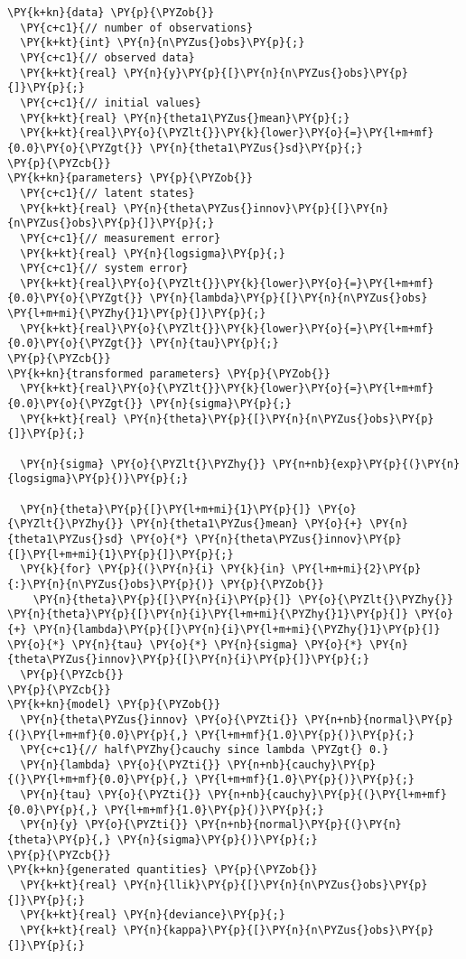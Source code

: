 \begin{Verbatim}[commandchars=\\\{\}]
\PY{k+kn}{data} \PY{p}{\PYZob{}}
  \PY{c+c1}{// number of observations}
  \PY{k+kt}{int} \PY{n}{n\PYZus{}obs}\PY{p}{;}
  \PY{c+c1}{// observed data}
  \PY{k+kt}{real} \PY{n}{y}\PY{p}{[}\PY{n}{n\PYZus{}obs}\PY{p}{]}\PY{p}{;}
  \PY{c+c1}{// initial values}
  \PY{k+kt}{real} \PY{n}{theta1\PYZus{}mean}\PY{p}{;}
  \PY{k+kt}{real}\PY{o}{\PYZlt{}}\PY{k}{lower}\PY{o}{=}\PY{l+m+mf}{0.0}\PY{o}{\PYZgt{}} \PY{n}{theta1\PYZus{}sd}\PY{p}{;}
\PY{p}{\PYZcb{}}
\PY{k+kn}{parameters} \PY{p}{\PYZob{}}
  \PY{c+c1}{// latent states}
  \PY{k+kt}{real} \PY{n}{theta\PYZus{}innov}\PY{p}{[}\PY{n}{n\PYZus{}obs}\PY{p}{]}\PY{p}{;}
  \PY{c+c1}{// measurement error}
  \PY{k+kt}{real} \PY{n}{logsigma}\PY{p}{;}
  \PY{c+c1}{// system error}
  \PY{k+kt}{real}\PY{o}{\PYZlt{}}\PY{k}{lower}\PY{o}{=}\PY{l+m+mf}{0.0}\PY{o}{\PYZgt{}} \PY{n}{lambda}\PY{p}{[}\PY{n}{n\PYZus{}obs} \PY{l+m+mi}{\PYZhy{}1}\PY{p}{]}\PY{p}{;}
  \PY{k+kt}{real}\PY{o}{\PYZlt{}}\PY{k}{lower}\PY{o}{=}\PY{l+m+mf}{0.0}\PY{o}{\PYZgt{}} \PY{n}{tau}\PY{p}{;}
\PY{p}{\PYZcb{}}
\PY{k+kn}{transformed parameters} \PY{p}{\PYZob{}}
  \PY{k+kt}{real}\PY{o}{\PYZlt{}}\PY{k}{lower}\PY{o}{=}\PY{l+m+mf}{0.0}\PY{o}{\PYZgt{}} \PY{n}{sigma}\PY{p}{;}
  \PY{k+kt}{real} \PY{n}{theta}\PY{p}{[}\PY{n}{n\PYZus{}obs}\PY{p}{]}\PY{p}{;}

  \PY{n}{sigma} \PY{o}{\PYZlt{}\PYZhy{}} \PY{n+nb}{exp}\PY{p}{(}\PY{n}{logsigma}\PY{p}{)}\PY{p}{;}

  \PY{n}{theta}\PY{p}{[}\PY{l+m+mi}{1}\PY{p}{]} \PY{o}{\PYZlt{}\PYZhy{}} \PY{n}{theta1\PYZus{}mean} \PY{o}{+} \PY{n}{theta1\PYZus{}sd} \PY{o}{*} \PY{n}{theta\PYZus{}innov}\PY{p}{[}\PY{l+m+mi}{1}\PY{p}{]}\PY{p}{;}
  \PY{k}{for} \PY{p}{(}\PY{n}{i} \PY{k}{in} \PY{l+m+mi}{2}\PY{p}{:}\PY{n}{n\PYZus{}obs}\PY{p}{)} \PY{p}{\PYZob{}}
    \PY{n}{theta}\PY{p}{[}\PY{n}{i}\PY{p}{]} \PY{o}{\PYZlt{}\PYZhy{}} \PY{n}{theta}\PY{p}{[}\PY{n}{i}\PY{l+m+mi}{\PYZhy{}1}\PY{p}{]} \PY{o}{+} \PY{n}{lambda}\PY{p}{[}\PY{n}{i}\PY{l+m+mi}{\PYZhy{}1}\PY{p}{]} \PY{o}{*} \PY{n}{tau} \PY{o}{*} \PY{n}{sigma} \PY{o}{*} \PY{n}{theta\PYZus{}innov}\PY{p}{[}\PY{n}{i}\PY{p}{]}\PY{p}{;}
  \PY{p}{\PYZcb{}}
\PY{p}{\PYZcb{}}
\PY{k+kn}{model} \PY{p}{\PYZob{}}
  \PY{n}{theta\PYZus{}innov} \PY{o}{\PYZti{}} \PY{n+nb}{normal}\PY{p}{(}\PY{l+m+mf}{0.0}\PY{p}{,} \PY{l+m+mf}{1.0}\PY{p}{)}\PY{p}{;}
  \PY{c+c1}{// half\PYZhy{}cauchy since lambda \PYZgt{} 0.}
  \PY{n}{lambda} \PY{o}{\PYZti{}} \PY{n+nb}{cauchy}\PY{p}{(}\PY{l+m+mf}{0.0}\PY{p}{,} \PY{l+m+mf}{1.0}\PY{p}{)}\PY{p}{;}
  \PY{n}{tau} \PY{o}{\PYZti{}} \PY{n+nb}{cauchy}\PY{p}{(}\PY{l+m+mf}{0.0}\PY{p}{,} \PY{l+m+mf}{1.0}\PY{p}{)}\PY{p}{;}
  \PY{n}{y} \PY{o}{\PYZti{}} \PY{n+nb}{normal}\PY{p}{(}\PY{n}{theta}\PY{p}{,} \PY{n}{sigma}\PY{p}{)}\PY{p}{;}
\PY{p}{\PYZcb{}}
\PY{k+kn}{generated quantities} \PY{p}{\PYZob{}}
  \PY{k+kt}{real} \PY{n}{llik}\PY{p}{[}\PY{n}{n\PYZus{}obs}\PY{p}{]}\PY{p}{;}
  \PY{k+kt}{real} \PY{n}{deviance}\PY{p}{;}
  \PY{k+kt}{real} \PY{n}{kappa}\PY{p}{[}\PY{n}{n\PYZus{}obs}\PY{p}{]}\PY{p}{;}


\end{Verbatim}
